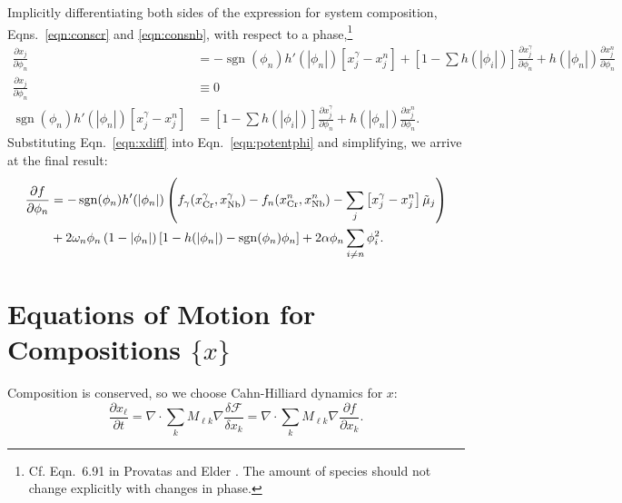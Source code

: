 \documentclass[10pt]{article}
\DeclareMathOperator{\sgn}{sgn}
\begin{document}
		Implicitly differentiating both sides of the expression for system composition,
		Eqns.~\ref{eqn:conscr} and \ref{eqn:consnb}, with respect to a phase,\footnote{
		Cf. Eqn.~6.91 in Provatas and Elder \cite{Provatas2010}. The amount of species should not change explicitly with changes in phase.
		}
		\begin{align}
			\frac{\partial x_j}{\partial \phi_n} &= -\sgn(\phi_n)h'(|\phi_n|)\left[x_j^{\gamma} - x_j^n\right]
			                                          + \left[1 - \sum h(|\phi_i|)\right] \frac{\partial x_j^{\gamma}}{\partial \phi_n}
			                                          + h(|\phi_n|) \frac{\partial x_j^{n}}{\partial \phi_n}\\
			\frac{\partial x_j}{\partial \phi_n} &\equiv 0\\
			\sgn(\phi_n)h'(|\phi_n|)\left[x_j^{\gamma} - x_j^n\right] &= \left[1 - \sum h(|\phi_i|)\right] \frac{\partial x_j^{\gamma}}{\partial \phi_n}
			                                                           + h(|\phi_n|) \frac{\partial x_j^{n}}{\partial \phi_n}.
			                                                           \label{eqn:xdiff}
		\end{align}
		Substituting Eqn.~\ref{eqn:xdiff} into Eqn.~\ref{eqn:potentphi} and simplifying,
		we arrive at the final result:
		\begin{align}\nonumber
			\frac{\partial f}{\partial \phi_n} &= -\sgn(\phi_n)h'(|\phi_n|)\left(f_{\gamma}(x_{\ce{Cr}}^{\gamma},x_{\ce{Nb}}^{\gamma})
			                                    - f_n(x_{\ce{Cr}}^n,x_{\ce{Nb}}^n) - \sum_j\left[x_j^{\gamma} - x_j^n\right]\tilde{\mu}_j\right)\\
			                                   &+ 2\omega_n\phi_n\left(1-|\phi_n|\right)\left[1 - h(|\phi_n|) - \sgn(\phi_n)\phi_n\right]
			                                    + 2\alpha\phi_n\sum_{i\neq n}\phi_i^2.
			\label{eqn:phieom}
		\end{align}		



	\newpage
	\section{Equations of Motion for Compositions $\{x\}$}
		Composition is conserved, so we choose Cahn-Hilliard dynamics for $x$:
		\begin{equation}
			\frac{\partial x_{\ell}}{\partial t} = \nabla\cdot\sum_k M_{\ell k}\nabla\frac{\delta\mathcal{F}}{\delta x_k}
			                                     = \nabla\cdot\sum_k M_{\ell k}\nabla\frac{\partial f}{\partial x_k}.\label{eqn:fick}
		\end{equation}
		
\end{document}
